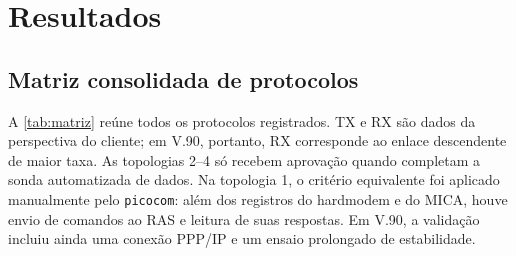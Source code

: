 \documentclass[12pt,a4paper]{article}
\begin{document}
\section{Resultados}

\subsection{Matriz consolidada de protocolos}

A \cref{tab:matriz} reúne todos os protocolos registrados. TX e RX são dados da
perspectiva do cliente; em V.90, portanto, RX corresponde ao enlace descendente de
maior taxa. As topologias 2--4 só recebem aprovação quando completam a sonda
automatizada de dados. Na topologia 1, o critério equivalente foi aplicado
manualmente pelo \texttt{picocom}: além dos registros do hardmodem e do MICA,
houve envio de comandos ao RAS e leitura de suas respostas. Em V.90, a validação
incluiu ainda uma conexão PPP/IP e um ensaio prolongado de estabilidade.
\end{document}
